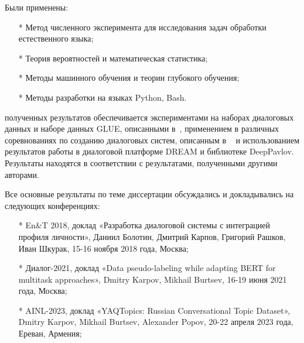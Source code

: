 {\methods}
Были
применены: %
\begin{enumerate}
\item[*] Метод численного эксперимента для исследования задач обработки естественного языка;
\item[*] Теория вероятностей и математическая статистика;
\item[*] Методы машинного обучения и теории глубокого обучения;
\item[*] Методы разработки на языках Python, Bash.
\end{enumerate}




{\reliability} полученных результатов обеспечивается экспериментами на наборах диалоговых данных и наборе данных GLUE, описанными в~\cite{pseudolabel,rumtl,enmtl,rutopics,dp_2023}, применением в различных соревнованиях по созданию диалоговых систем, описанным в ~\cite{dream1,dream2,dream1_trudy,Болотин_Карпов_Рашков_Шкурак_2019} и использованием результатов работы в диалоговой платформе DREAM и библиотеке DeepPavlov. Результаты находятся в соответствии с результатами, полученными другими авторами.

{\probation}
Все основные результаты по теме диссертации обсуждались и докладывались на следующих конференциях:
\begin{itemize}
    \item[*] En\&T 2018, доклад «Разработка диалоговой системы с интеграцией профиля личности», Даниил Болотин, Дмитрий Карпов, Григорий Рашков, Иван Шкурак, 15-16 ноября 2018 года, Москва;
    \item[*] Диалог-2021, доклад «Data pseudo-labeling while adapting BERT for multitask approaches», Dmitry Karpov, Mikhail Burtsev, 16-19 июня 2021 года, Москва;
    \item[*] AINL-2023, доклад «YAQTopics: Russian Conversational Topic Dataset», Dmitry Karpov, Mikhail Burtsev, Alexander Popov, 20-22 апреля 2023 года, Ереван, Армения;
\end{itemize}%


